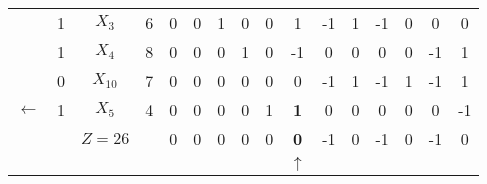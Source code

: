 \begin{tabular}{cccccccccccccccc}
            & 1       & $X_3$   & 6       & 0       & 0       & 1       & 0       & 0       & 1       & -1      & 1       & -1      & 0       & 0       & 0 \\
            & 1       & $X_4$   & 8       & 0       & 0       & 0       & 1       & 0       & -1      & 0       & 0       & 0       & 0       & -1      & 1 \\
            & 0       & $X_{10}$ & 7       & 0       & 0       & 0       & 0       & 0       & 0       & -1      & 1       & -1      & 1       & -1      & 1 \\
    $\leftarrow$ & 1       & \textcolor[rgb]{ 1,  0,  0}{\boldmath{}\textbf{$X_5$}\unboldmath{}} & 4       & 0       & 0       & 0       & 0       & 1       & \textbf{1} & 0       & 0       & 0       & 0       & 0       & -1 \bigstrut[b]\\
\cline{2-16}            &         & $Z=26$  &         & 0       & 0       & 0       & 0       & 0       & \textcolor[rgb]{ 0,  .439,  .753}{\textbf{0}} & -1      & 0       & -1      & 0       & -1      & 0 \bigstrut\\
\cline{2-16}            &         &         &         &         &         &         &         &         & $\uparrow$ &         &         &         &         &         &  \bigstrut[t]\\
    \end{tabular}%
